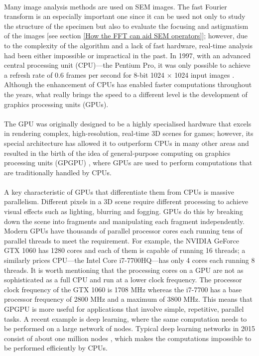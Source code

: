 \documentclass[12pt, twocolumn]{report}
\begin{document}
\paragraph{}
Many image analysis methods are used on SEM images. The fast Fourier transform is an especially important one since it can be used not only to study the structure of the specimen but also to evaluate the focusing and astigmatism of the images [see section \ref{How the FFT can aid SEM operators}]; however, due to the complexity of the algorithm and a lack of fast hardware, real-time analysis had been either impossible or impractical in the past. In 1997, with an advanced central processing unit (CPU)---the Pentium Pro, it was only possible to achieve a refresh rate of 0.6 frames per second for 8-bit 1024 $\times$ 1024 input images \cite{SEM image sharpness measurement}. Although the enhancement of CPUs has enabled faster computations throughout the years, what really brings the speed to a different level is the development of graphics processing units (GPUs).

\paragraph{}
The GPU was originally designed to be a highly specialised hardware that excels in rendering complex, high-resolution, real-time 3D scenes for games; however, its special architecture has allowed it to outperform CPUs in many other areas and resulted in the birth of the idea of general-purpose computing on graphics processing units (GPGPU) \cite{GPU computing}, where GPUs are used to perform computations that are traditionally handled by CPUs.

\paragraph{}
A key characteristic of GPUs that differentiate them from CPUs is massive parallelism. Different pixels in a 3D scene require different processing to achieve visual effects such as lighting, blurring and fogging. GPUs do this by breaking down the scene into fragments and manipulating each fragment independently. Modern GPUs have thousands of parallel processor cores each running tens of parallel threads to meet the requirement. For example, the NVIDIA GeForce GTX 1060 has 1280 cores and each of them is capable of running 16 threads; a similarly prices CPU---the Intel Core i7-7700HQ---has only 4 cores each running 8 threads. It is worth mentioning that the processing cores on a GPU are not as sophisticated as a full CPU and run at a lower clock frequency. The processor clock frequency of the GTX 1060 is 1708 MHz whereas the i7-7700 has a base processor frequency of 2800 MHz and a maximum of 3800 MHz. This means that GPGPU is more useful for applications that involve simple, repetitive, parallel tasks. A recent example is deep learning, where the same computation needs to be performed on a large network of nodes. Typical deep learning networks in 2015 consist of about one million nodes \cite{Deep learning}, which makes the computations impossible to be performed efficiently by CPUs.
\end{document}
